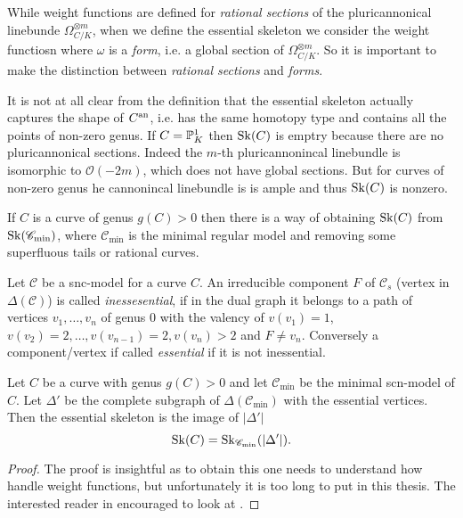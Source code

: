 \begin{remark}
	While weight functions are defined for \emph{rational sections} of the pluricannonical linebunde $\Omega_{C / K}^{\otimes m}$, when we define the essential skeleton we consider the weight functiosn where $\omega$ is a \emph{form}, i.e. a global section of $\Omega_{C / K} ^{\otimes m}$. 
	So it is important to make the distinction between \emph{rational sections} and \emph{forms}.
\end{remark}

It is not at all clear from the definition that the essential skeleton actually captures the shape of $C{}^{\text{an}}$, i.e. has the same homotopy type and contains all the points of non-zero genus. 
If $C = \mathbb{P}^{1}_K$ then $\operatorname{Sk}(C)$ is emptry because there are no pluricannonical sections. Indeed the $m$-th pluricannonincal linebundle is isomorphic to  $\mathcal{O}(-2m)$, which does not have global sections. 
But for curves of non-zero genus he cannonincal linebundle is is ample and thus $\operatorname{Sk}(C)$ is nonzero. 

If $C$ is a curve of genus $g(C) > 0$ then there is a way of obtaining $\operatorname{Sk}(C)$ from $\operatorname{Sk}(\mathscr C_\text{min} )$, where $\mathscr C _\text{min}$ is the minimal regular model and removing some superfluous tails or rational curves.  

\begin{definition}
	Let $\mathscr C$ be a snc-model for a curve $C$. 
	An irreducible component $F$ of $\mathscr C_s$ (vertex in $\Delta(\mathscr C)$) is called \emph{inessesential}, if in the dual graph it belongs to a path of vertices $v_1, \ldots, v_n$ of genus $0$ with the valency of $v(v_1) = 1$, $v(v_{2}) = 2, \ldots, v(v_{n-1}) = 2, v(v_n) > 2$ and $F \ne v_n$. 
	Conversely a component/vertex if called \emph{essential} if it is not inessential. 
\end{definition}

\begin{theorem}
	Let $C$ be a curve with genus $g(C) > 0$ and let $\mathscr C_\text{min} $ be the minimal scn-model of $C$. 
	Let $\Delta'$ be the complete subgraph of $\Delta(\mathscr C_\text{min} )$ with the essential vertices. 
	Then the essential skeleton is the image of $|\Delta'|$\[
		\operatorname{Sk}(C) = \operatorname{Sk}_{\mathscr C_\text{min} }(|\Delta'|)
	.\] 
\end{theorem}
\begin{proof}
	The proof is insightful as to obtain this one needs to understand how handle weight functions, but unfortunately it is too long to put in this thesis. 
	The interested reader in encouraged to look at \cite[thm 3.3.13]{bakerWeightFunctionsBerkovich2016}. 
\end{proof}

